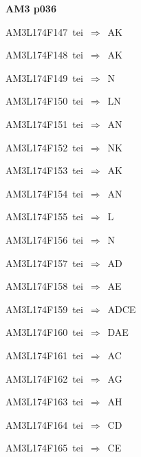 \par\vfill\eject
{\bf\hfill AM3 p036\hfill\hbox{}}\par\bigskip
{\sixrm AM3L174F147\ {\sixit tei}\ }$\Rightarrow$\ AK\par\smallskip
{\sixrm AM3L174F148\ {\sixit tei}\ }$\Rightarrow$\ AK\par\smallskip
{\sixrm AM3L174F149\ {\sixit tei}\ }$\Rightarrow$\ N\par\smallskip
{\sixrm AM3L174F150\ {\sixit tei}\ }$\Rightarrow$\ LN\par\smallskip
{\sixrm AM3L174F151\ {\sixit tei}\ }$\Rightarrow$\ AN\par\smallskip
{\sixrm AM3L174F152\ {\sixit tei}\ }$\Rightarrow$\ NK\par\smallskip
{\sixrm AM3L174F153\ {\sixit tei}\ }$\Rightarrow$\ AK\par\smallskip
{\sixrm AM3L174F154\ {\sixit tei}\ }$\Rightarrow$\ AN\par\smallskip
{\sixrm AM3L174F155\ {\sixit tei}\ }$\Rightarrow$\ L\par\smallskip
{\sixrm AM3L174F156\ {\sixit tei}\ }$\Rightarrow$\ N\par\smallskip
{\sixrm AM3L174F157\ {\sixit tei}\ }$\Rightarrow$\ AD\par\smallskip
{\sixrm AM3L174F158\ {\sixit tei}\ }$\Rightarrow$\ AE\par\smallskip
{\sixrm AM3L174F159\ {\sixit tei}\ }$\Rightarrow$\ ADCE\par\smallskip
{\sixrm AM3L174F160\ {\sixit tei}\ }$\Rightarrow$\ DAE\par\smallskip
{\sixrm AM3L174F161\ {\sixit tei}\ }$\Rightarrow$\ AC\par\smallskip
{\sixrm AM3L174F162\ {\sixit tei}\ }$\Rightarrow$\ AG\par\smallskip
{\sixrm AM3L174F163\ {\sixit tei}\ }$\Rightarrow$\ AH\par\smallskip
{\sixrm AM3L174F164\ {\sixit tei}\ }$\Rightarrow$\ CD\par\smallskip
{\sixrm AM3L174F165\ {\sixit tei}\ }$\Rightarrow$\ CE\par\smallskip


